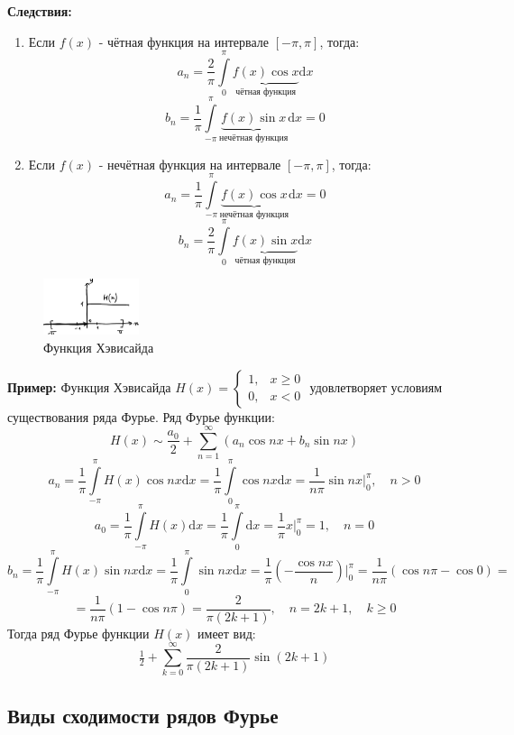 \documentclass[12pt, a4paper]{article}
\newcommand{\di}{\mathrm{d}}
\begin{document}
\textbf{Следствия:}
\begin{enumerate}
 \item Если $f(x)$ - чётная функция на интервале $[-\pi, \pi]$, тогда:
 \[a_n = \frac{2}{\pi} \int \limits_{0}^{\pi} \underbrace{f(x) \cos x}_{\textrm{чётная функция}} \di x \]
 \[b_n = \frac{1}{\pi} \int \limits_{-\pi}^{\pi} \underbrace{f(x) \sin x}_{\textrm{нечётная функция}} \di x = 0 \]
 \item Если $f(x)$ - нечётная функция на интервале $[-\pi, \pi]$, тогда:
 \[a_n = \frac{1}{\pi} \int \limits_{-\pi}^{\pi} \underbrace{f(x) \cos x}_{\textrm{нечётная функция}} \di x = 0 \]
 \[b_n = \frac{2}{\pi} \int \limits_{0}^{\pi} \underbrace{f(x) \sin x}_{\textrm{чётная функция}} \di x \]
\end{enumerate}

\begin{figure}
  \centering
  \includegraphics[width=0.25\textwidth]{09}
  \vspace{-4mm}
  \caption{Функция Хэвисайда}
\end{figure}

\textbf{Пример:} Функция Хэвисайда $H(x) = \begin{cases} 1, & x \geq 0 \\ 0, & x < 0 \end{cases}$ удовлетворяет условиям существования ряда Фурье. Ряд Фурье функции:
\[H(x) \sim \frac{a_0}{2} + \sum_{n=1}^{\infty} (a_n \cos nx + b_n \sin nx) \]
\[a_n = \frac{1}{\pi} \int \limits_{-\pi}^{\pi} H(x) \cos nx \di x = \frac{1}{\pi} \int \limits_{0}^{\pi} \cos nx \di x = \frac{1}{n\pi} \sin nx |^{\pi}_0, \quad n>0 \]
\[a_0 = \frac{1}{\pi} \int \limits_{-\pi}^{\pi} H(x) \di x = \frac{1}{\pi} \int \limits_{0}^{\pi} \di x = \frac{1}{\pi} x |^{\pi}_0 = 1, \quad n=0 \]
\[b_n = \frac{1}{\pi} \int \limits_{-\pi}^{\pi} H(x) \sin nx \di x = \frac{1}{\pi} \int \limits_{0}^{\pi} \sin nx \di x = \frac{1}{\pi} \left( -\frac{\cos nx}{n} \right) |^{\pi}_0 = \frac{1}{n\pi} (\cos n\pi - \cos 0) = \]
\[= \frac{1}{n\pi} (1-\cos n\pi) = \frac{2}{\pi (2k+1)}, \quad n = 2k+1, \quad k \geq 0 \]
Тогда ряд Фурье функции $H(x)$ имеет вид:
\[\tfrac{1}{2} + \sum_{k=0}^{\infty} \frac{2}{\pi (2k+1)} \sin (2k+1) \]

\subsection{Виды сходимости рядов Фурье}
\end{document}

